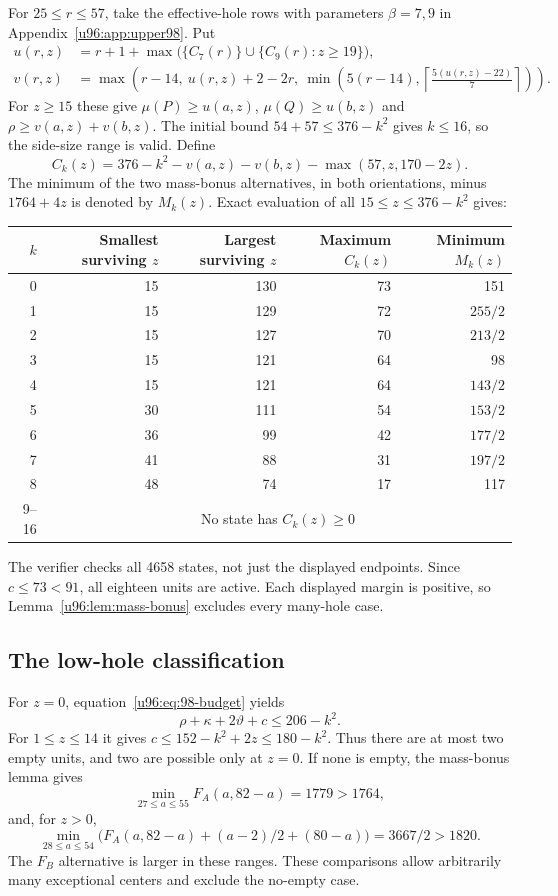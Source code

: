 \documentclass[11pt,a4paper]{article}
\theoremstyle{remark}
\begin{document}
For $25\leq r\leq57$, take the effective-hole rows with parameters
$\beta=7,9$ in Appendix~\ref{u96:app:upper98}. Put
\[
\begin{split}
 u(r,z)&=r+1+\max\bigl(\{C_7(r)\}\cup
                         \{C_9(r):z\geq19\}\bigr),\\
 v(r,z)&=\max\left(r-14,\ u(r,z)+2-2r,\
       \min\left(5(r-14),\left\lceil\frac{5(u(r,z)-22)}7\right\rceil\right)\right).
\end{split}
\]
For $z\geq15$ these give $\mu(P)\geq u(a,z)$,
$\mu(Q)\geq u(b,z)$ and $\rho\geq v(a,z)+v(b,z)$.
The initial bound $54+57\leq376-k^2$ gives $k\leq16$, so the side-size
range is valid. Define
\[
 C_k(z)=376-k^2-v(a,z)-v(b,z)-\max(57,z,170-2z).
\]
The minimum of the two mass-bonus alternatives, in both orientations,
minus $1764+4z$ is denoted by $M_k(z)$.
Exact evaluation of all $15\leq z\leq376-k^2$ gives:
\begin{center}\small
\begin{tabular}{rrrrr}
\toprule
$k$&Smallest surviving $z$&Largest surviving $z$&Maximum $C_k(z)$&Minimum $M_k(z)$\\
\midrule
0&15&130&73&151\\
1&15&129&72&$255/2$\\
2&15&127&70&$213/2$\\
3&15&121&64&98\\
4&15&121&64&$143/2$\\
5&30&111&54&$153/2$\\
6&36&99&42&$177/2$\\
7&41&88&31&$197/2$\\
8&48&74&17&117\\
9--16&\multicolumn{4}{c}{No state has $C_k(z)\geq0$}\\
\bottomrule
\end{tabular}
\end{center}
The verifier checks all 4658 states, not just the displayed endpoints.
Since $c\leq73<91$, all eighteen units are active. Each displayed margin
is positive, so Lemma~\ref{u96:lem:mass-bonus} excludes every many-hole case.

\subsection{The low-hole classification}
For $z=0$, equation~\eqref{u96:eq:98-budget} yields
\begin{equation}
 \rho+\kappa+2\vartheta+c\leq206-k^2.
 \label{u96:eq:98-zero}
\end{equation}
For $1\leq z\leq14$ it gives
$c\leq152-k^2+2z\leq180-k^2$.
Thus there are at most two empty units, and two are possible only at
$z=0$. If none is empty, the mass-bonus lemma gives
\[
 \min_{27\leq a\leq55}F_A(a,82-a)=1779>1764,
\]
and, for $z>0$,
\[
 \min_{28\leq a\leq54}
 \bigl(F_A(a,82-a)+(a-2)/2+(80-a)\bigr)
 =3667/2>1820.
\]
The $F_B$ alternative is larger in these ranges. These comparisons allow
arbitrarily many exceptional centers and exclude the no-empty case.
\end{document}
